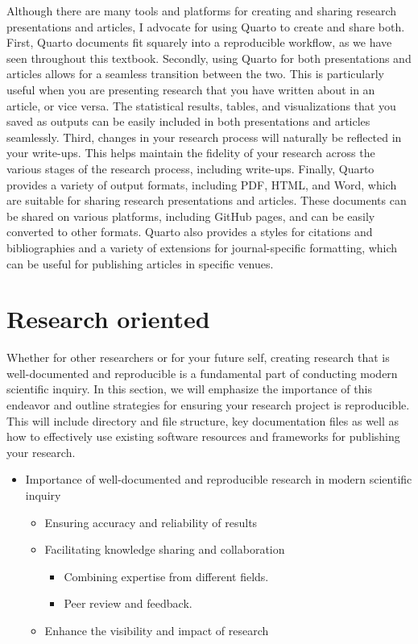 \documentclass[
  letterpaper,
]{latex/krantz}
\providecommand{\tightlist}{%
  \setlength{\itemsep}{0pt}\setlength{\parskip}{0pt}}\usepackage{longtable,booktabs,array}
\theoremstyle{definition}
\theoremstyle{remark}
\begin{document}
Although there are many tools and platforms for creating and sharing
research presentations and articles, I advocate for using Quarto to
create and share both. First, Quarto documents fit squarely into a
reproducible workflow, as we have seen throughout this textbook.
Secondly, using Quarto for both presentations and articles allows for a
seamless transition between the two. This is particularly useful when
you are presenting research that you have written about in an article,
or vice versa. The statistical results, tables, and visualizations that
you saved as outputs can be easily included in both presentations and
articles seamlessly. Third, changes in your research process will
naturally be reflected in your write-ups. This helps maintain the
fidelity of your research across the various stages of the research
process, including write-ups. Finally, Quarto provides a variety of
output formats, including PDF, HTML, and Word, which are suitable for
sharing research presentations and articles. These documents can be
shared on various platforms, including GitHub pages, and can be easily
converted to other formats. Quarto also provides a styles for citations
and bibliographies and a variety of extensions for journal-specific
formatting, which can be useful for publishing articles in specific
venues.

\section{Research oriented}\label{sec-contr-research-oriented}

Whether for other researchers or for your future self, creating research
that is well-documented and reproducible is a fundamental part of
conducting modern scientific inquiry. In this section, we will emphasize
the importance of this endeavor and outline strategies for ensuring your
research project is reproducible. This will include directory and file
structure, key documentation files as well as how to effectively use
existing software resources and frameworks for publishing your research.

\begin{itemize}
\tightlist
\item
  Importance of well-documented and reproducible research in modern
  scientific inquiry

  \begin{itemize}
  \tightlist
  \item
    Ensuring accuracy and reliability of results
  \item
    Facilitating knowledge sharing and collaboration

    \begin{itemize}
    \tightlist
    \item
      Combining expertise from different fields.
    \item
      Peer review and feedback.
    \end{itemize}
  \item
    Enhance the visibility and impact of research
  \end{itemize}
\end{itemize}
\end{document}
